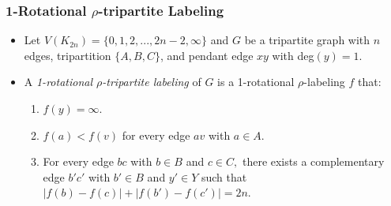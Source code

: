 \documentclass[11pt,serif,professionalfont,aspectratio=169]{beamer}
\newcommand{\vertex}{\node[vertex]}
\theoremstyle{plain}
\begin{document}
\begin{frame}
\frametitle{1-Rotational $\rho$-tripartite Labeling}
\begin{itemize}
\item Let $V(K_{2n})=\{0,1,2,...,2n-2,\infty\}$ and $G$ be a tripartite graph with $n$ edges, tripartition $\{A,B,C\}$, and pendant edge $xy$ with deg$(y)=1$.
\item
A \emph{1-rotational $\rho$-tripartite labeling} of $G$ is a 1-rotational $\rho$-labeling $f$ that:
\begin{enumerate}
    \item $f(y)=\infty.$
    \item $f(a)<f(v)$ for every edge $av$ with $a \in A.$
    \item For every edge $bc$ with $b \in B$ and $c \in C,$ there exists a complementary edge $b'c'$ with $b' \in B$ and $y' \in Y$ such that 
 $|f(b)-f(c)|+|f(b')-f(c')|=2n.$
\end{enumerate}
\end{itemize}
\begin{center}
\end{center}
\end{frame}
\end{document}
